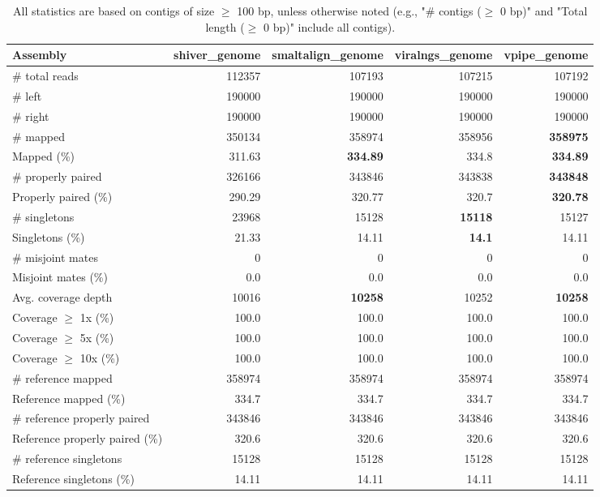 \documentclass[12pt,a4paper]{article}
\begin{document}
\begin{table}[ht]
\begin{center}
\caption{All statistics are based on contigs of size $\geq$ 100 bp, unless otherwise noted (e.g., "\# contigs ($\geq$ 0 bp)" and "Total length ($\geq$ 0 bp)" include all contigs).}
\begin{tabular}{|l*{4}{|r}|}
\hline
Assembly & shiver\_genome & smaltalign\_genome & viralngs\_genome & vpipe\_genome \\ \hline
\# total reads & 112357 & 107193 & 107215 & 107192 \\ \hline
\# left & 190000 & 190000 & 190000 & 190000 \\ \hline
\# right & 190000 & 190000 & 190000 & 190000 \\ \hline
\# mapped & 350134 & 358974 & 358956 & {\bf 358975} \\ \hline
Mapped (\%) & 311.63 & {\bf 334.89} & 334.8 & {\bf 334.89} \\ \hline
\# properly paired & 326166 & 343846 & 343838 & {\bf 343848} \\ \hline
Properly paired (\%) & 290.29 & 320.77 & 320.7 & {\bf 320.78} \\ \hline
\# singletons & 23968 & 15128 & {\bf 15118} & 15127 \\ \hline
Singletons (\%) & 21.33 & 14.11 & {\bf 14.1} & 14.11 \\ \hline
\# misjoint mates & 0 & 0 & 0 & 0 \\ \hline
Misjoint mates (\%) & 0.0 & 0.0 & 0.0 & 0.0 \\ \hline
Avg. coverage depth & 10016 & {\bf 10258} & 10252 & {\bf 10258} \\ \hline
Coverage $\geq$ 1x (\%) & 100.0 & 100.0 & 100.0 & 100.0 \\ \hline
Coverage $\geq$ 5x (\%) & 100.0 & 100.0 & 100.0 & 100.0 \\ \hline
Coverage $\geq$ 10x (\%) & 100.0 & 100.0 & 100.0 & 100.0 \\ \hline
\# reference mapped & 358974 & 358974 & 358974 & 358974 \\ \hline
Reference mapped (\%) & 334.7 & 334.7 & 334.7 & 334.7 \\ \hline
\# reference properly paired & 343846 & 343846 & 343846 & 343846 \\ \hline
Reference properly paired (\%) & 320.6 & 320.6 & 320.6 & 320.6 \\ \hline
\# reference singletons & 15128 & 15128 & 15128 & 15128 \\ \hline
Reference singletons (\%) & 14.11 & 14.11 & 14.11 & 14.11 \\ \hline

\end{tabular}
\end{center}
\end{table}
\end{document}
